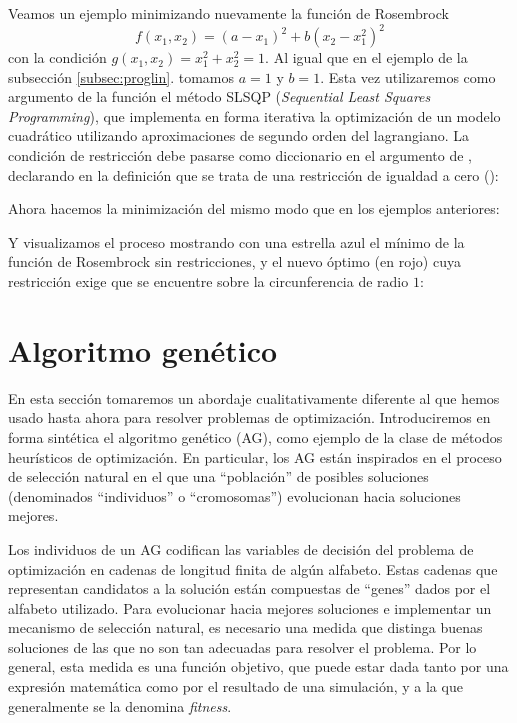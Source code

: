 Veamos un ejemplo minimizando nuevamente la función de Rosembrock 
\[ f(x_1, x_2) = (a - x_1)^2 + b (x_2 - x_1^2)^2 \]
con la condición $g(x_1, x_2) = x_1^2 + x_2^2 = 1$. Al igual que en el ejemplo de la subsección \ref{subsec:proglin}. tomamos $a = 1$ y $b = 1$. Esta vez utilizaremos como argumento de la función  el método SLSQP (\textit{Sequential Least Squares Programming}), que implementa en forma iterativa la optimización de un modelo cuadrático utilizando aproximaciones de segundo orden del lagrangiano. La condición de restricción debe pasarse como diccionario en el argumento  de , declarando en la definición que se trata de una restricción de igualdad a cero ():


Ahora hacemos la minimización del mismo modo que en los ejemplos anteriores:


Y visualizamos el proceso mostrando con una estrella azul el mínimo de la función de Rosembrock sin restricciones, y el nuevo óptimo (en rojo) cuya restricción exige que se encuentre sobre la circunferencia de radio $1$:


\section{Algoritmo genético}

En esta sección tomaremos un abordaje cualitativamente diferente al que hemos usado hasta ahora para resolver problemas de optimización. Introduciremos en forma sintética el algoritmo genético (AG), como ejemplo de la clase de métodos heurísticos de optimización. En particular, los AG están inspirados en el proceso de selección natural en el que una ``población'' de posibles soluciones (denominados ``individuos'' o ``cromosomas'') evolucionan hacia soluciones mejores.

Los individuos de un AG codifican las variables de decisión del problema de optimización en cadenas de longitud finita de algún alfabeto. Estas cadenas que representan candidatos a la solución están compuestas de ``genes'' dados por el alfabeto utilizado. Para evolucionar hacia mejores soluciones e implementar un mecanismo de selección natural, es necesario una medida que distinga buenas soluciones de las que no son tan adecuadas para resolver el problema. Por lo general, esta medida es una función objetivo, que puede estar dada tanto por una expresión matemática como por el resultado de una simulación, y a la que generalmente se la denomina \textit{fitness}.

